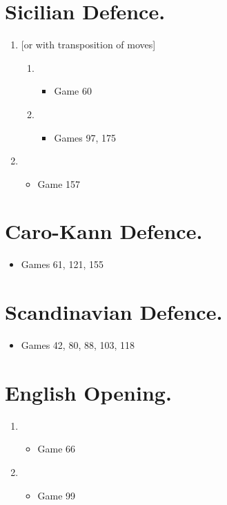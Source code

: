 \section{Sicilian Defence.}
\newgame{}
\begin{enumerate}
\item {} [or with transposition of moves] 
\begin{enumerate}
\item {}
\begin{itemize}
\item Game 60
\end{itemize}
\item {}
\begin{itemize}
\item Games 97, 175
\end{itemize}
\end{enumerate}
\item {}
\begin{itemize}
\item Game 157
\end{itemize}
\end{enumerate}

\section{Caro-Kann Defence.}
\newgame{}
\begin{itemize}
\item Games 61, 121, 155
\end{itemize}

\section{Scandinavian Defence.}
\newgame{}
\begin{itemize}
\item Games 42, 80, 88, 103, 118
\end{itemize}

\section{English Opening.}
\newgame{}
\begin{enumerate}
\item {}
\begin{itemize}
\item Game 66
\end{itemize}
\item {}
\begin{itemize}
\item Game 99
\end{itemize}
\end{enumerate}